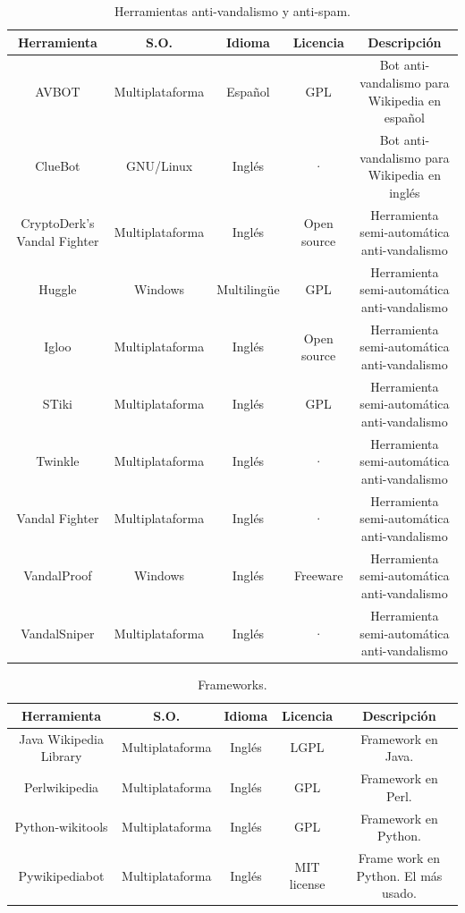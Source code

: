 \documentclass[11pt,onecolumn]{article}
\begin{document}
\begin{table}
\centering
\begin{tabular}{| c | c | c | c | c |}
\hline
\textbf{Herramienta} & \textbf{S.O.} & \textbf{Idioma} & \textbf{Licencia} & \textbf{Descripción} \\
\hline
AVBOT & Multiplataforma & Español & GPL & Bot anti-vandalismo para Wikipedia en español \\ \hline
ClueBot & GNU/Linux & Inglés & · & Bot anti-vandalismo para Wikipedia en inglés \\ \hline
CryptoDerk's Vandal Fighter & Multiplataforma & Inglés & Open source & Herramienta semi-automática anti-vandalismo \\ \hline
Huggle & Windows & Multilingüe & GPL & Herramienta semi-automática anti-vandalismo \\ \hline
Igloo & Multiplataforma & Inglés & Open source & Herramienta semi-automática anti-vandalismo \\ \hline
STiki & Multiplataforma & Inglés & GPL & Herramienta semi-automática anti-vandalismo \\ \hline
Twinkle & Multiplataforma & Inglés & · & Herramienta semi-automática anti-vandalismo \\ \hline
Vandal Fighter & Multiplataforma & Inglés & · & Herramienta semi-automática anti-vandalismo \\ \hline
VandalProof & Windows & Inglés & Freeware & Herramienta semi-automática anti-vandalismo \\ \hline
VandalSniper & Multiplataforma & Inglés & · & Herramienta semi-automática anti-vandalismo \\ \hline
\end{tabular}
\caption{Herramientas anti-vandalismo y anti-spam.}
\label{tab:vandaltoolstable}
\end{table}


\begin{table}
\centering
\begin{tabular}{| c | c | c | c | c |}
\hline
\textbf{Herramienta} & \textbf{S.O.} & \textbf{Idioma} & \textbf{Licencia} & \textbf{Descripción} \\
\hline
Java Wikipedia Library & Multiplataforma & Inglés & LGPL & Framework en Java. \\ \hline
Perlwikipedia & Multiplataforma & Inglés & GPL & Framework en Perl. \\ \hline
Python-wikitools & Multiplataforma & Inglés & GPL & Framework en Python. \\ \hline
Pywikipediabot & Multiplataforma & Inglés & MIT license & Frame work en Python. El más usado. \\ \hline
\end{tabular}
\caption{Frameworks.}
\label{tab:frameworkstable}
\end{table}
\end{document}
